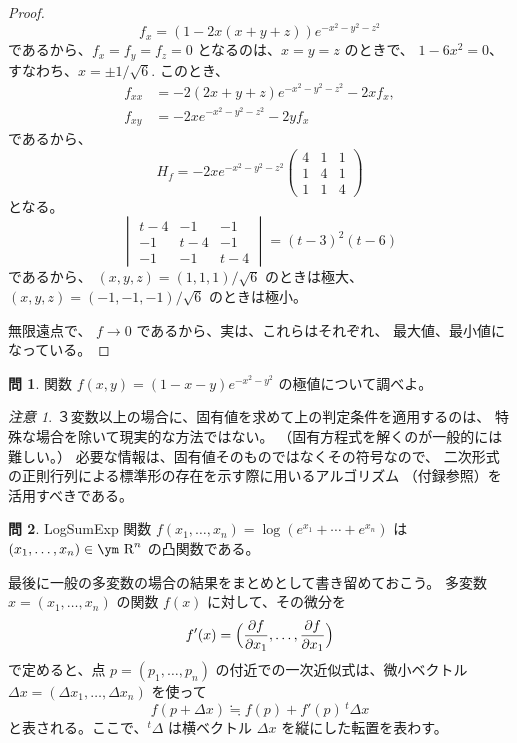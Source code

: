 \documentclass[a4paper]{jsarticle}
\theoremstyle{definition}
\newtheorem{Exercise}{問}%
\theoremstyle{remark}
\newtheorem{Remark}{注意}
\newcommand{\R}{\text{\ym R}}
\begin{document}
\begin{proof}
\[
f_x = (1 - 2x(x+y+z))e^{-x^2-y^2-z^2}
\]
であるから、$f_x = f_y = f_z = 0$ となるのは、$x = y = z$ のときで、
$1 - 6x^2 = 0$、すなわち、$x = \pm 1/\sqrt{6}$. 
このとき、
\begin{align*}
f_{xx} &= -2(2x + y + z)e^{-x^2-y^2-z^2} - 2x f_x,\\
f_{xy} &= -2xe^{-x^2-y^2-z^2} - 2y f_x
\end{align*}
であるから、
\[
H_f = -2xe^{-x^2-y^2-z^2} 
\begin{pmatrix}
4 & 1 & 1\\
1 & 4 & 1\\
1 & 1 & 4
\end{pmatrix}
\]
となる。
\[
\begin{vmatrix}
t-4 & -1 & -1\\
-1 & t-4 & -1\\
-1 & -1 & t-4
\end{vmatrix}
= (t-3)^2(t-6)
\]
であるから、
$(x,y,z) = (1,1,1)/\sqrt{6}$ のときは極大、
$(x,y,z) = (-1,-1,-1)/\sqrt{6}$ のときは極小。

無限遠点で、 $f \to 0$ であるから、実は、これらはそれぞれ、
最大値、最小値になっている。
\end{proof}

\begin{Exercise}
関数 $f(x,y) = (1-x-y) e^{-x^2-y^2}$ の極値について調べよ。
\end{Exercise}

\begin{Remark}{\small
３変数以上の場合に、固有値を求めて上の判定条件を適用するのは、
特殊な場合を除いて現実的な方法ではない。
（固有方程式を解くのが一般的には難しい。）
必要な情報は、固有値そのものではなくその符号なので、
二次形式の正則行列による標準形の存在を示す際に用いるアルゴリズム
（付録参照）を活用すべきである。}
\end{Remark}

\begin{Exercise}
LogSumExp 関数 $f(x_1,\dots,x_n) = \log(e^{x_1}+ \cdots + e^{x_n})$ は $(x_1,\dots,x_n) \in \R^n$ の凸関数である。
\end{Exercise}

最後に一般の多変数の場合の結果をまとめとして書き留めておこう。
多変数 $x = (x_1,\dots,x_n)$ の関数 $f(x)$ に対して、その微分を
\[
  f'(x) = \Bigl(\frac{\partial f}{\partial x_1}, \dots, \frac{\partial f}{\partial x_1}\Bigr)
\]
で定めると、点 $p = (p_1,\dots,p_n)$ の付近での一次近似式は、微小ベクトル $\Delta x = (\Delta x_1,\dots, \Delta x_n)$ を使って
\[
f(p+\Delta x) \fallingdotseq f(p) + f'(p)\,{}^t\Delta x
\]
と表される。ここで、${}^t\Delta$ は横ベクトル $\Delta x$ を縦にした転置を表わす。
\end{document}
